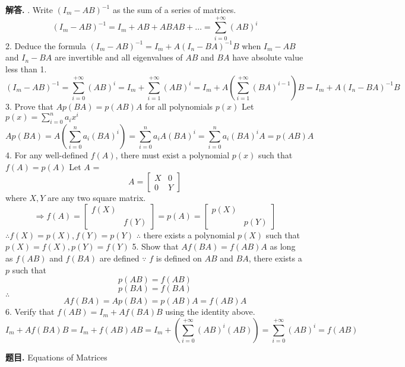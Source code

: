 \documentclass[12pt, a4paper, oneside]{article}
\newcounter{problemname}
\newenvironment{problem}{\begin{shaded}\stepcounter{problemname}\par\noindent\textbf{题目\arabic{problemname}. }}{\end{shaded}\par}
\newenvironment{solution}{\par\noindent\textbf{解答. }}{\par}
\begin{document}
\begin{CJK}{UTF8}{gbsn}
\begin{solution} . Write $(I_m - AB)^{-1}$ as the sum of a series of matrices.
  $$ (I_m - AB)^{-1} = I_m + AB + ABAB + \dots = \sum_{i=0}^{+\infty} (AB)^i$$ 
  2. Deduce the formula $(I_m - AB)^{-1} = I_m + A(I_n-BA)^{-1}B$ when $I_m - AB$ and $I_n-BA$
  are invertible and all eigenvalues of $AB$ and $BA$ have absolute value less than 1.
  $$ (I_m - AB)^{-1} = \sum_{i=0}^{+\infty} (AB)^i = I_m + \sum_{i=1}^{+\infty} (AB)^i = I_m + A\left(\sum_{i=1}^{+\infty} (BA)^{i-1}\right)B = I_m + A(I_n - BA)^{-1}B$$ 
  3. Prove that $Ap(BA) = p(AB)A$ for all polynomials $p(x)$ \newline
  Let $p(x) = \sum_{i=0}^n{a_i}x^i$
  $$Ap(BA) = A\left(\sum_{i=0}^{n} a_i(BA)^{i}\right) = \sum_{i=0}^{n} a_iA(BA)^{i} = \sum_{i=0}^{n} a_i(BA)^{i}A = p(AB)A$$
  4. For any well-defined $f(A)$, there must exist a polynomial $p(x)$ such that $f(A) = p(A)$\newline
  Let $A$ = $$ A = \begin{bmatrix}
    X & 0 \\ 0 & Y
  \end{bmatrix}$$
  where $X, Y$ are any two square matrix.
  $$ \Rightarrow f(A) = \begin{bmatrix}
    f(X) & \\ & f(Y) 
  \end{bmatrix} = p(A) = \begin{bmatrix}
    p(X) & \\ & p(Y)
  \end{bmatrix}$$
  $\therefore f(X) = p(X), f(Y) = p(Y)$ \newline
  $\therefore$  there exists a polynomial $p(X)$ such that $p(X) = f(X), p(Y) = f(Y)$
  5. Show that $Af(BA) = f(AB)A$ as long as $f(AB)$ and $f(BA)$ are defined \newline
  $\because$ $f$ is defined on $AB$ and $BA$, there exists a $p$ such that
  $$p(AB) = f(AB)$$ $$p(BA) = f(BA)$$
  $\therefore$
  $$Af(BA) = Ap(BA) = p(AB)A = f(AB)A $$
  6. Verify that $f(AB) = I_m + Af(BA)B$ using the identity above. \newline
  $$I_m+Af(BA)B = I_m + f(AB)AB = I_m + \left(\sum_{i=0}^{+\infty} {(AB)^i}(AB)\right) = \sum_{i=0}^{+\infty}(AB)^i=f(AB)$$
\end{solution}



\begin{problem}
  Equations of Matrices
\end{problem}


\end{CJK}
\end{document}
